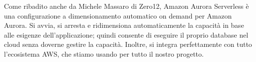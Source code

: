Come ribadito anche da Michele Massaro di Zero12, Amazon Aurora Serverless è una configurazione a dimensionamento automatico on demand per Amazon Aurora. Si avvia, si arresta e ridimensiona automaticamente la capacità in base alle esigenze dell'applicazione; quindi consente di eseguire il proprio database nel cloud senza doverne gestire la capacità. Inoltre, si integra perfettamente con tutto l'ecosistema AWS, che stiamo usando per tutto il nostro progetto.

\pagebreak
